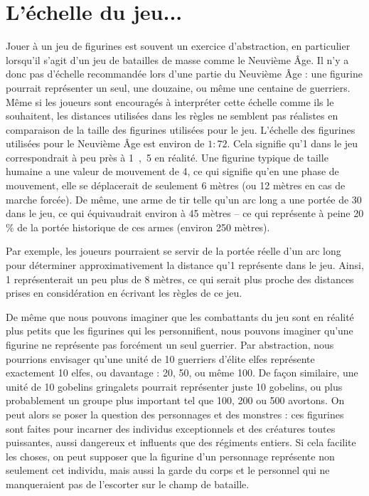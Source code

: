 \newpage
\section{L'échelle du jeu...}

Jouer à un jeu de figurines est souvent un exercice d'abstraction, en particulier lorsqu'il s'agit d'un jeu de batailles de masse comme le Neuvième Âge. Il n’y a donc pas d’échelle recommandée lors d’une partie du Neuvième Âge : une figurine pourrait représenter un seul, une douzaine, ou même une centaine de guerriers. Même si les joueurs sont encouragés à interpréter cette échelle comme ils le souhaitent, les distances utilisées dans les règles ne semblent pas réalistes en comparaison de la taille des figurines utilisées pour le jeu. L’échelle des figurines utilisées pour le Neuvième Âge est environ de $1:72$. Cela signifie qu’\unit{1}\pouce{} dans le jeu correspondrait à peu près à \unit{1,5}\meter{} en réalité. Une figurine typique de taille humaine a une valeur de mouvement de \unit{4}\pouce{}, ce qui signifie qu’en une phase de mouvement, elle se déplacerait de seulement 6 mètres (ou 12 mètres en cas de marche forcée). De même, une arme de tir telle qu’un arc long a une portée de \unit{30}\pouce{} dans le jeu, ce qui équivaudrait environ à 45 mètres – ce qui représente à peine 20 \% de la portée historique de ces armes (environ 250 mètres).

Par exemple, les joueurs pourraient se servir de la portée réelle d’un arc long pour déterminer approximativement la distance qu’\unit{1}\pouce{} représente dans le jeu. Ainsi, \unit{1}\pouce{} représenterait un peu plus de 8 mètres, ce qui serait plus proche des distances prises en considération en écrivant les règles de ce jeu.

De même que nous pouvons imaginer que les combattants du jeu sont en réalité plus petits que les figurines qui les personnifient, nous pouvons imaginer qu’une figurine ne représente pas forcément un seul guerrier. Par abstraction, nous pourrions envisager qu’une unité de 10 guerriers d’élite elfes représente exactement 10 elfes, ou davantage : 20, 50, ou même 100. De façon similaire, une unité de 10 gobelins gringalets pourrait représenter juste 10 gobelins, ou plus probablement un groupe plus important tel que 100, 200 ou 500 avortons. On peut alors se poser la question des personnages et des monstres : ces figurines sont faites pour incarner des individus exceptionnels et des créatures toutes puissantes, aussi dangereux et influents que des régiments entiers. Si cela facilite les choses, on peut supposer que la figurine d’un personnage représente non seulement cet individu, mais aussi la garde du corps et le personnel qui ne manqueraient pas de l’escorter sur le champ de bataille.

